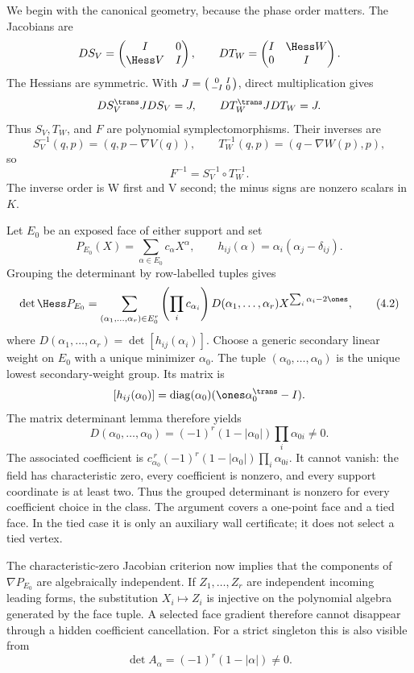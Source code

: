 \documentclass[11pt]{article}
\theoremstyle{definition}
\theoremstyle{remark}
\begin{document}
We begin with the canonical geometry, because the phase order matters.
The Jacobians are
\[
 DS_V=\begin{pmatrix}I&0\\ \Hess V&I\end{pmatrix},\qquad
 DT_W=\begin{pmatrix}I&\Hess W\\0&I\end{pmatrix}.
\]
The Hessians are symmetric.  With
$J=\begin{psmallmatrix}0&I\\-I&0\end{psmallmatrix}$, direct multiplication
gives
\[
 DS_V^{\trans}JDS_V=J,\qquad DT_W^{\trans}JDT_W=J.
\]
Thus $S_V,T_W$, and $F$ are polynomial symplectomorphisms.  Their inverses
are
\[
 S_V^{-1}(q,p)=(q,p-\nabla V(q)),\qquad
 T_W^{-1}(q,p)=(q-\nabla W(p),p),
\]
so
\[
 F^{-1}=S_V^{-1}\circ T_W^{-1}.
\tag{4.1}
\]
The inverse order is W first and V second; the minus signs are nonzero
scalars in $K$.

Let $E_0$ be an exposed face of either support and set
\[
 P_{E_0}(X)=\sum_{\alpha\in E_0}c_\alpha X^\alpha,\qquad
 h_{ij}(\alpha)=\alpha_i(\alpha_j-\delta_{ij}).
\]
Grouping the determinant by row-labelled tuples gives
\[
 \det\Hess P_{E_0}
 =
 \sum_{(\alpha_1,\ldots,\alpha_r)\in E_0^r}
 \left(\prod_i c_{\alpha_i}\right)
 D(\alpha_1,\ldots,\alpha_r)X^{\sum_i\alpha_i-2\ones},
\tag{4.2}
\]
where $D(\alpha_1,\ldots,\alpha_r)=
\det[h_{ij}(\alpha_i)]$.  Choose a generic secondary linear weight on
$E_0$ with a unique minimizer $\alpha_0$.  The tuple
$(\alpha_0,\ldots,\alpha_0)$ is the unique lowest secondary-weight group.
Its matrix is
\[
 [h_{ij}(\alpha_0)]
 =\operatorname{diag}(\alpha_0)
   (\ones\alpha_0^{\trans}-I).
\]
The matrix determinant lemma therefore yields
\[
 D(\alpha_0,\ldots,\alpha_0)
 =(-1)^r(1-|\alpha_0|)\prod_i\alpha_{0i}\neq0.
\tag{4.3}
\]
The associated coefficient is
$c_{\alpha_0}^{\,r}(-1)^r(1-|\alpha_0|)\prod_i\alpha_{0i}$.
It cannot vanish: the field has characteristic zero, every coefficient is
nonzero, and every support coordinate is at least two.  Thus the grouped
determinant is nonzero for every coefficient choice in the class.  The
argument covers a one-point face and a tied face.  In the tied case it is
only an auxiliary wall certificate; it does not select a tied vertex.

The characteristic-zero Jacobian criterion now implies that the components
of $\nabla P_{E_0}$ are algebraically independent.  If
$Z_1,\ldots,Z_r$ are independent incoming leading forms, the substitution
$X_i\mapsto Z_i$ is injective on the polynomial algebra generated by the
face tuple.  A selected face gradient therefore cannot disappear through a
hidden coefficient cancellation.  For a strict singleton this is also
visible from
\[
 \det A_\alpha=(-1)^r(1-|\alpha|)\neq0.
\tag{4.4}
\]
\end{document}
